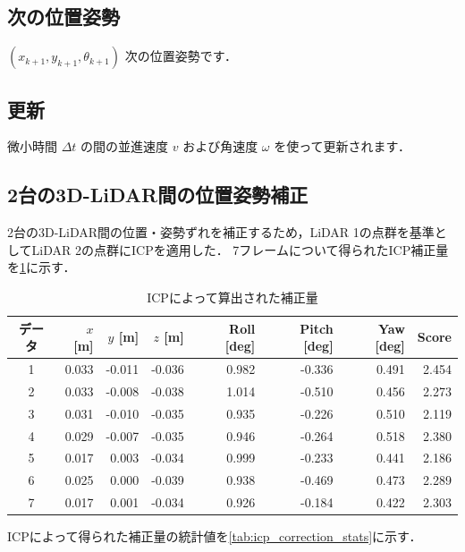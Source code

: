 \subsection{次の位置姿勢}
$(x_{k+1}, y_{k+1}, \theta_{k+1})$ 次の位置姿勢です．

\subsection{更新}
微小時間 $\Delta t$ の間の並進速度 $v$ および角速度 $\omega$ を使って更新されます．
\subsection{2台の3D-LiDAR間の位置姿勢補正}

2台の3D-LiDAR間の位置・姿勢ずれを補正するため，LiDAR 1の点群を基準としてLiDAR 2の点群にICPを適用した．
7フレームについて得られたICP補正量を\cref{tab:icp_correction}に示す．

\begin{table}[tb]
    \centering
    \caption{ICPによって算出された補正量}
    \label{tab:icp_correction}
    \begin{tabular}{c|rrr|rrr|r}
        \hline
        データ & $x$ [m] & $y$ [m] & $z$ [m] & Roll [deg] & Pitch [deg] & Yaw [deg] & Score \\
        \hline
        1 & 0.033 & -0.011 & -0.036 & 0.982 & -0.336 & 0.491 & 2.454 \\
        2 & 0.033 & -0.008 & -0.038 & 1.014 & -0.510 & 0.456 & 2.273 \\
        3 & 0.031 & -0.010 & -0.035 & 0.935 & -0.226 & 0.510 & 2.119 \\
        4 & 0.029 & -0.007 & -0.035 & 0.946 & -0.264 & 0.518 & 2.380 \\
        5 & 0.017 &  0.003 & -0.034 & 0.999 & -0.233 & 0.441 & 2.186 \\
        6 & 0.025 &  0.000 & -0.039 & 0.938 & -0.469 & 0.473 & 2.289 \\
        7 & 0.017 &  0.001 & -0.034 & 0.926 & -0.184 & 0.422 & 2.303 \\
        \hline
    \end{tabular}
\end{table}

ICPによって得られた補正量の統計値を\cref{tab:icp_correction_stats}に示す．

